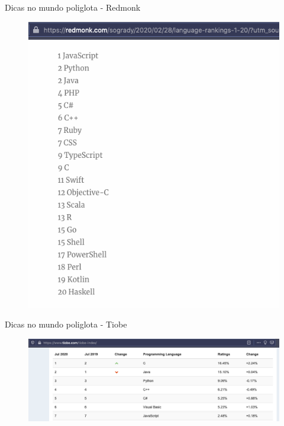 \documentclass[aspectratio=169]{beamer}
\begin{document}
\begin{frame}{Dicas no mundo poliglota - Redmonk}
	\begin{figure}
		\centering
		\includegraphics[width=0.9\linewidth]{Images/redmonk}
	\end{figure}
\end{frame}

\begin{frame}{Dicas no mundo poliglota - Tiobe}
	\begin{figure}
		\centering
		\includegraphics[width=0.9\linewidth]{Images/tiobe}
	\end{figure}
\end{frame}
\end{document}
